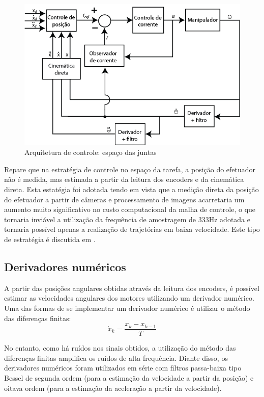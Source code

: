 \documentclass[]{politex}
\begin{document}
\begin{figure}[H]
    \centering
    \includegraphics[scale=0.5]{imagens/ControleEspacoDaTarefa.png}
    \caption{Arquitetura de controle: espaço das juntas}
    \label{fig:ControleEspacoDaTarefa}
\end{figure}

Repare que na estratégia de controle no espaço da tarefa, a posição do efetuador não é medida, mas estimada a partir da leitura dos encoders e da cinemática direta. Esta estatégia foi adotada tendo em vista que a medição direta da posição do efetuador a partir de câmeras e processamento de imagens acarretaria um aumento muito significativo no custo computacional da malha de controle, o que tornaria inviável a utilização da frequência de amostragem de 333Hz adotada e tornaria possível apenas a realização de trajetórias em baixa velocidade. Este tipo de estratégia é discutida em \cite{Craig}.

\subsection{Derivadores numéricos}
\label{derivador}

A partir das posições angulares obtidas através da leitura dos encoders, é possível estimar as velocidades angulares dos motores utilizando um derivador numérico. Uma das formas de se implementar um derivador numérico é utilizar o método das diferenças finitas:
\begin{equation}
\dot{x}_k = \frac{x_k - x_{k-1}}{T}
\end{equation}

No entanto, como há ruídos nos sinais obtidos, a utilização  do método das diferenças finitas amplifica os ruídos de alta frequência. Diante disso, os derivadores numéricos foram utilizados em série com filtros passa-baixa tipo Bessel de segunda ordem (para a estimação da velocidade a partir da posição) e oitava ordem (para a estimação da aceleração a partir da velocidade).
\end{document}
